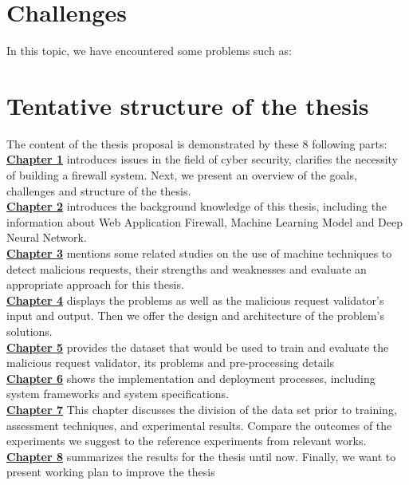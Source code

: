 \section{Challenges}
\label{sec:challenges}
In this topic, we have encountered some problems such as:
\section{Tentative structure of the thesis}
\label{sec:structure}
	\newcommand\nextintro{\\[4mm]}
	The content of the thesis proposal is demonstrated by these 8 following parts: \nextintro
	\hyperref[chap:introduction]{\textbf{Chapter 1}} introduces issues in the field of cyber security, clarifies the necessity of building a firewall system. Next, we present an overview of the goals, challenges and structure of the thesis.\nextintro
	\hyperref[chap:backgrounds]{\textbf{Chapter 2}} introduces the background knowledge of this thesis, including the information about Web Application Firewall, Machine Learning Model and Deep Neural Network.\nextintro
	\hyperref[chap:literaturereview]{\textbf{Chapter 3}} mentions some related studies on the use of machine techniques to detect malicious requests, their strengths and weaknesses and evaluate an appropriate approach for this thesis.\nextintro
	\hyperref[chap:phuong_an_de_xuat]{\textbf{Chapter 4}} displays the problems as well as the malicious request validator's input and output. Then we offer the design and architecture of the problem's solutions.\nextintro
	\hyperref[chap:tap_du_lieu]{\textbf{Chapter 5}} provides the dataset that would be used to train and evaluate the malicious request validator, its problems and pre-processing details\nextintro
	\hyperref[chap:hien_thuc_he_thong]{\textbf{Chapter 6}} shows the implementation and deployment processes, including system frameworks and system specifications.\nextintro
	\newpage
	\hyperref[chap:thi_nghiem_va_danh_gia]{\textbf{Chapter 7}} This chapter discusses the division of the data set prior to training, assessment techniques, and experimental results. Compare the outcomes of the experiments we suggest to the reference experiments from relevant works.\nextintro
	\hyperref[chap:tong_ket]{\textbf{Chapter 8}} summarizes the results for the thesis until now. Finally, we want to present working plan to improve the thesis\nextintro
